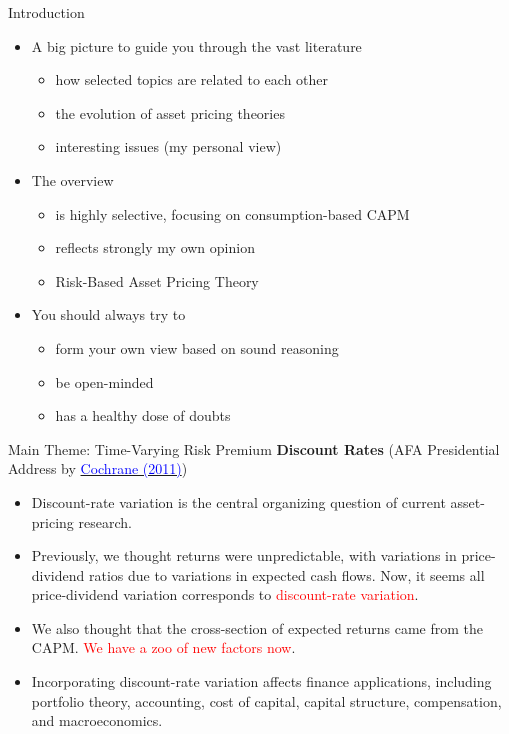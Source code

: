 \documentclass{beamer}
\begin{document}
\begin{frame}{Introduction}
	\begin{itemize}
		\item A big picture to guide you through the vast literature
		\begin{itemize}
			\item how selected topics are related to each other
			\item the evolution of asset pricing theories
			\item interesting issues (my personal view)
		\end{itemize}
		\item The overview
		\begin{itemize}
			\item is highly selective, focusing on consumption-based CAPM
			\item reflects strongly my own opinion
			\item Risk-Based Asset Pricing Theory
		\end{itemize}
		\item You should always try to
		\begin{itemize}
			\item form your own view based on sound reasoning
			\item be open-minded
			\item has a healthy dose of doubts
		\end{itemize}
\end{itemize}
\end{frame}

\begin{frame}{Main Theme: Time-Varying Risk Premium}
	\textbf{Discount Rates} (AFA Presidential Address by \href{https://doi.org/10.1111/j.1540-6261.2011.01671.x}{\textcolor{blue}{Cochrane (2011)}})
	\begin{itemize}
		\item Discount-rate variation is the \alert{central} organizing question of current asset-pricing research.
		\item Previously, we thought returns were unpredictable, with variations in price-dividend ratios due to variations in expected cash flows. Now, it seems all price-dividend variation corresponds to \textcolor{red}{discount-rate variation}.
		\item We also thought that the cross-section of expected returns came from the CAPM. \textcolor{red}{We have a zoo of new factors now}.
		\item Incorporating discount-rate variation affects finance applications, including portfolio theory, accounting, cost of capital, capital structure, compensation, and macroeconomics.
	\end{itemize}
\end{frame}
\end{document}
